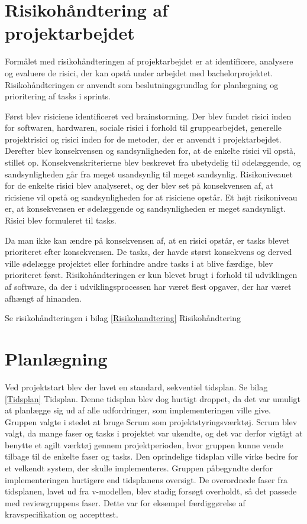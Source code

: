 \section{Risikohåndtering af projektarbejdet}
Formålet med risikohåndteringen af projektarbejdet er at identificere, analysere og evaluere de risici, der kan opstå under arbejdet med bachelorprojektet. Risikohåndteringen er anvendt som beslutningsgrundlag for planlægning og prioritering af tasks i sprints. 

Først blev risiciene identificeret ved brainstorming. Der blev fundet risici inden for softwaren, hardwaren, sociale risici i forhold til gruppearbejdet, generelle projektrisici og risici inden for de metoder, der er anvendt i projektarbejdet. Derefter blev konsekvensen og sandsynligheden for, at de enkelte risici vil opstå, stillet op. Konsekvenskriterierne blev beskrevet fra ubetydelig til ødelæggende, og sandsynligheden går fra meget usandsynlig til meget sandsynlig. Risikoniveauet for de enkelte risici blev analyseret, og der blev set på konsekvensen af, at ricisiene vil opstå og sandsynligheden for at risiciene opstår. Et højt risikoniveau er, at konsekvensen er ødelæggende og sandsynligheden er meget sandsynligt. Risici blev formuleret til tasks. 

Da man ikke kan ændre på konsekvensen af, at en risici opstår, er tasks blevet prioriteret efter konsekvensen. De tasks, der havde størst konsekvens og derved ville ødelægge projektet eller forhindre andre tasks i at blive færdige, blev prioriteret først. Risikohåndteringen er kun blevet brugt i forhold til udviklingen af software, da der i udviklingsprocessen har været flest opgaver, der har været afhængt af hinanden.

Se risikohåndteringen i bilag \ref{Risikohandtering} Risikohåndtering

\section{Planlægning}
Ved projektstart blev der lavet en standard, sekventiel tidsplan. Se bilag \ref{Tidsplan} Tidsplan. Denne tidsplan blev dog hurtigt droppet, da det var umuligt at planlægge sig ud af alle udfordringer, som implementeringen ville give. Gruppen valgte i stedet at bruge Scrum som projektstyringsværktøj. Scrum blev valgt, da mange faser og tasks i projektet var ukendte, og det var derfor vigtigt at benytte et agilt værktøj gennem projektperioden, hvor gruppen kunne vende tilbage til de enkelte faser og tasks. Den oprindelige tidsplan ville virke bedre for et velkendt system, der skulle implementeres. Gruppen påbegyndte derfor implementeringen hurtigere end tidsplanens oversigt. De overordnede faser fra tidsplanen, lavet ud fra v-modellen, blev stadig forsøgt overholdt, så det passede med reviewgruppens faser. Dette var for eksempel færdiggørelse af kravspecifikation og accepttest. 

